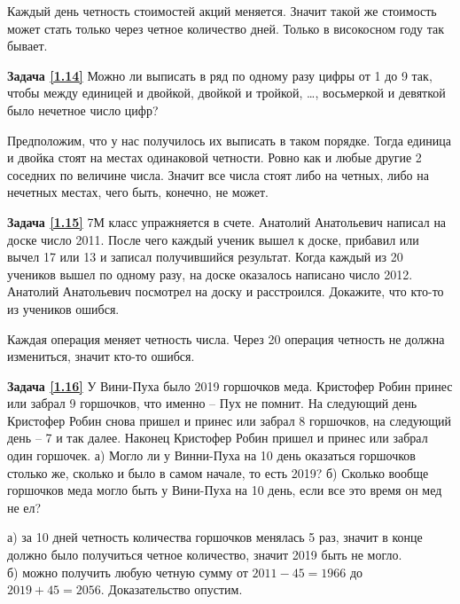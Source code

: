 \begin{prf}
	Каждый день четность стоимостей акций меняется. Значит такой же стоимость может стать только через четное количество дней. Только в високосном году так бывает.
\end{prf}

\textbf{Задача \ref{1.14}} Можно ли выписать в ряд по одному разу цифры от 1 до 9 так, чтобы между единицей и двойкой, двойкой и тройкой, \dots, восьмеркой и девяткой было нечетное число цифр?

\begin{prf}
	Предположим, что у нас получилось их выписать в таком порядке. Тогда единица и двойка стоят на местах одинаковой четности. Ровно как и любые другие 2 соседних по величине числа. Значит все числа стоят либо на четных, либо на нечетных местах, чего быть, конечно, не может.
\end{prf}


\textbf{Задача \ref{1.15}} 7М класс упражняется в счете. Анатолий Анатольевич написал на доске число 2011. После чего каждый ученик вышел к доске, прибавил или вычел 17 или 13 и записал получившийся результат. Когда каждый из 20 учеников вышел по одному разу, на доске оказалось написано число 2012. Анатолий Анатольевич посмотрел на доску и расстроился. Докажите, что кто-то из учеников ошибся.

\begin{prf}
	Каждая операция меняет четность числа. Через 20 операция четность не должна измениться, значит кто-то ошибся.
\end{prf}


\textbf{Задача \ref{1.16}}
	У Вини-Пуха было 2019 горшочков меда. Кристофер Робин принес или забрал 9 горшочков, что именно – Пух не помнит. На следующий день Кристофер Робин снова пришел и принес или забрал 8 горшочков, на следующий день – 7 и так далее. Наконец Кристофер Робин пришел и принес или забрал один горшочек.  а) Могло ли у Винни-Пуха на 10 день оказаться горшочков столько же, сколько и было в самом начале, то есть 2019? б) Сколько вообще горшочков меда могло быть у Вини-Пуха на 10 день, если все это время он мед не ел?

\begin{prf}
	а) за 10 дней четность количества горшочков менялась 5 раз, значит в конце должно было получиться четное количество, значит 2019 быть не могло.\\
	б) можно получить любую четную сумму от $2011-45=1966$ до $2019+45=2056$. Доказательство опустим. 
\end{prf}

